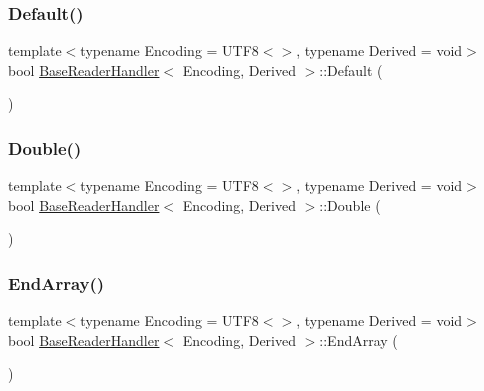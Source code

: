 \subsubsection{\texorpdfstring{Default()}{Default()}}
{\footnotesize\ttfamily template$<$typename Encoding = U\+T\+F8$<$$>$, typename Derived = void$>$ \\
bool \hyperlink{structBaseReaderHandler}{Base\+Reader\+Handler}$<$ Encoding, Derived $>$\+::Default (\begin{DoxyParamCaption}{ }\end{DoxyParamCaption})\hspace{0.3cm}{\ttfamily [inline]}}

\mbox{\label{structBaseReaderHandler_a8156ea6ae5b8cd23a8b700e92a8af1eb}} 
\subsubsection{\texorpdfstring{Double()}{Double()}}
{\footnotesize\ttfamily template$<$typename Encoding = U\+T\+F8$<$$>$, typename Derived = void$>$ \\
bool \hyperlink{structBaseReaderHandler}{Base\+Reader\+Handler}$<$ Encoding, Derived $>$\+::Double (\begin{DoxyParamCaption}\item[{double}]{ }\end{DoxyParamCaption})\hspace{0.3cm}{\ttfamily [inline]}}

\mbox{\label{structBaseReaderHandler_ae9d60a8779b6a77a7f283d64961879fb}} 
\subsubsection{\texorpdfstring{End\+Array()}{EndArray()}}
{\footnotesize\ttfamily template$<$typename Encoding = U\+T\+F8$<$$>$, typename Derived = void$>$ \\
bool \hyperlink{structBaseReaderHandler}{Base\+Reader\+Handler}$<$ Encoding, Derived $>$\+::End\+Array (\begin{DoxyParamCaption}\item[{\hyperlink{rapidjson_8h_a5ed6e6e67250fadbd041127e6386dcb5}{Size\+Type}}]{ }\end{DoxyParamCaption})\hspace{0.3cm}{\ttfamily [inline]}}

